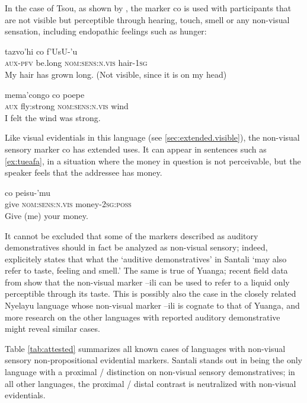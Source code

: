 \documentclass[oneside,a4paper,11pt]{article}
\newcommand{\ipa}[1]{{\phon \mbox{#1}}} %
\begin{document}
In the case of Tsou, as shown by \citet[50-1]{yang00tsou.case}, the marker \ipa{co} is used with participants that are not visible but perceptible through hearing, touch, smell or any non-visual sensation, including endopathic feelings such as hunger:


\begin{exe}
\ex 
\gll \ipa{mi-cu} \ipa{tazvo'hi} \ipa{co} \ipa{f'UsU-'u} \\
\textsc{aux-pfv} be.long \textsc{nom:sens:n.vis} hair-\textsc{1sg} \\
\glt My hair has grown long. (Not visible, since it is on my head)
\end{exe}

\begin{exe}
\ex 
\gll \ipa{mo} \ipa{mema'congo} \ipa{co} \ipa{poepe} \\
\textsc{aux} fly:strong \textsc{nom:sens:n.vis} wind \\
\glt I felt the wind was strong.
\end{exe}

Like visual evidentials in this language (see \ref{sec:extended.visible}), the non-visual sensory marker \ipa{co} has extended uses. It can appear in sentences such as \ref{ex:tueafa}, in a situation where the money in question is not perceivable, but the speaker feels that the addressee has money.

\begin{exe}
\ex  \label{ex:tueafa}
\gll \ipa{tueafa}   \ipa{co} \ipa{peisu-'mu} \\
give \textsc{nom:sens:n.vis} money-\textsc{2sg:poss} \\
\glt Give (me) your money.
\end{exe}

It cannot be excluded that some of the markers described as auditory demonstratives should in fact be analyzed as non-visual sensory; indeed, \citet[42]{neukom01santali} explicitely states that what the `auditive demonstratives' in Santali `may also refer to taste, feeling and smell.' The same is true of Yuanga; recent field data from \citet{bril-yuanga} show that the non-visual marker  \ipa{--ili} can be used to refer to a liquid only perceptible through its taste. This is possibly also the case in the closely related Nyelayu language whose non-visual marker  \ipa{--ili} is cognate to that of Yuanga, and more research on the other languages with reported auditory demonstrative might reveal similar cases.

Table \ref{tab:attested} summarizes all known cases of languages with non-visual sensory non-propositional evidential markers.  Santali stands out in being the only language with a proximal / distinction on non-visual sensory demonstratives; in all other languages, the proximal / distal contrast is neutralized with non-visual evidentials. 
\end{document}
